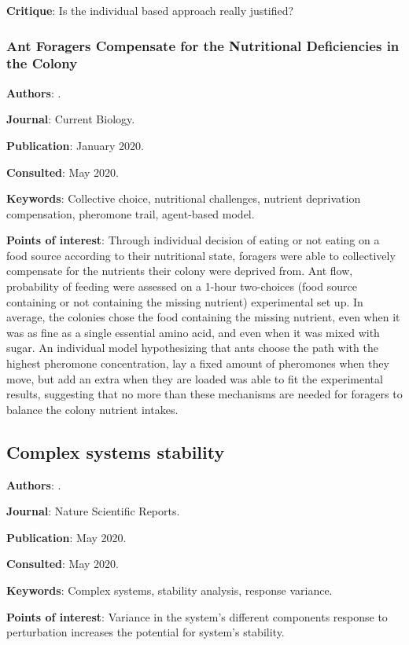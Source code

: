 \documentclass[12pt,a4paper]{article}
\begin{document}
\textbf{Critique}: Is the individual based approach really justified? 

\newpage

\subsubsection*{Ant Foragers Compensate for the Nutritional Deficiencies in the Colony}

\textbf{Authors}: \cite{csata2020ant}.

\textbf{Journal}: Current Biology.

\textbf{Publication}: January 2020.

\textbf{Consulted}: May 2020.

\textbf{Keywords}: Collective choice, nutritional challenges, nutrient deprivation compensation, pheromone trail, agent-based model.

\textbf{Points of interest}: Through individual decision of eating or not eating on a food source according to their nutritional state, foragers were able to collectively compensate for the nutrients their colony were deprived from. Ant flow, probability of feeding were assessed on a 1-hour two-choices (food source containing or not containing the missing nutrient) experimental set up. In average, the colonies chose the food containing the missing nutrient, even when it was as fine as a single essential amino acid, and even when it was mixed with sugar. An individual model hypothesizing that ants choose the path with the highest pheromone concentration, lay a fixed amount of pheromones when they move, but add an extra when they are loaded was able to fit the experimental results, suggesting that no more than these mechanisms are needed for foragers to balance the colony nutrient intakes. 

\newpage

\subsection*{Complex systems stability}

\textbf{Authors}: \cite{duthie2020component}.

\textbf{Journal}: Nature Scientific Reports.

\textbf{Publication}: May 2020.

\textbf{Consulted}: May 2020.

\textbf{Keywords}: Complex systems, stability analysis, response variance.

\textbf{Points of interest}: Variance in the system's different components response to perturbation increases the potential for system's stability.

\newpage

\newpage

\nocite{*}
\end{document}
